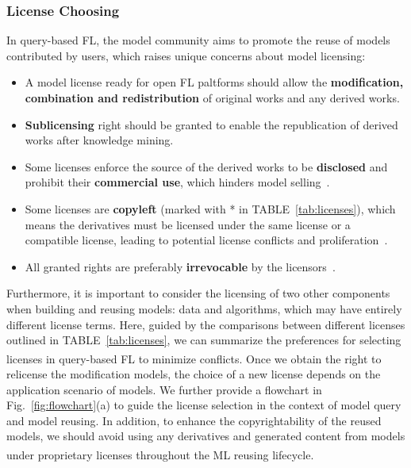 
\subsubsection{License Choosing}
\label{sec:choosing}
In query-based FL, the model community aims to promote the reuse of models contributed by users, which raises unique concerns about model licensing:
\begin{itemize}
  \item A model license ready for open FL paltforms should allow the \textbf{modification, combination and redistribution} of original works and any derived works.
  \item \textbf{Sublicensing} right should be granted to enable the republication of derived works after knowledge mining.
  \item Some licenses enforce the source of the derived works to be \textbf{disclosed} and prohibit their \textbf{commercial use}, which hinders model selling~\cite{chen2019towards}.
  \item Some licenses are \textbf{copyleft} (marked with * in TABLE~\ref{tab:licenses}), which means the derivatives must be licensed under the same license or a compatible license, leading to potential license conflicts and proliferation~\cite{gomulkiewicz2009open}.
  \item All granted rights are preferably \textbf{irrevocable} by the licensors~\cite{reddy2009jacobsen}.
\end{itemize}

Furthermore, it is important to consider the licensing of two other components when building and reusing models: data and algorithms, which may have entirely different license terms. 
Here, guided by the comparisons between different licenses outlined in TABLE~\ref{tab:licenses}, we can summarize the preferences for selecting licenses in query-based FL to minimize conflicts\textsuperscript{}.
Once we obtain the right to relicense the modification models, the choice of a new license depends on the application scenario of models. 
We further provide a flowchart in Fig.~\ref{fig:flowchart}(a) to guide the license selection in the context of model query and model reusing.
In addition, to enhance the copyrightability of the reused models, we should avoid using any derivatives and generated content from models under proprietary licenses throughout the ML reusing lifecycle\textsuperscript{}.

